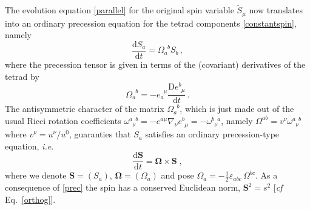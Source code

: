 \documentclass[
superscriptaddress,
preprint,
prd,tightenlines,showpacs,nofootinbib,
eqsecnum,
amsfonts,amsmath,amssymb]{revtex4-1}
\newcommand{\ud}{\mathrm{d}}
\newcommand{\uD}{\mathrm{D}}
\begin{document}
The evolution equation \eqref{parallel} for the original spin variable
$\tilde{S}_\mu$ now translates into an ordinary precession equation
for the tetrad components \eqref{constantspin}, namely
%
\begin{equation}\label{evolS}
\frac{\ud S_{a}}{\ud t} = \Omega_{a}^{\phantom{a}b} S_{b}\, , 
\end{equation} 
%
where the precession tensor is given in terms of the (covariant)
derivatives of the tetrad by
%
\begin{equation}\label{Omegaij}
\Omega_{a}^{\phantom{a}b} = - e_a^{\phantom{a}\mu} \frac{\uD e^b_{\phantom{b}\mu}}{\ud t} \, .
\end{equation} 
%
The antisymmetric character of the matrix $\Omega_{a}^{\phantom{a}b}$,
which is just made out of the usual Ricci rotation coefficients
$\omega_{\phantom{a}\nu\phantom{b}}^{a\phantom{\nu}b} = -
e^{a\mu}\nabla_\nu e^b_{\phantom{b}\mu} = -
\omega_{\phantom{b}\nu\phantom{a}}^{b\phantom{\nu}a}$, namely
$\Omega^{ab} = v^\nu
\omega_{\phantom{a}\nu\phantom{b}}^{a\phantom{\nu}b}$ where $v^\nu =
u^\nu/u^0$, guaranties that $S_a$ satisfies
an ordinary precession-type equation, \textit{i.e.}
%
\begin{equation}\label{prec}
	\frac{\ud \mathbf{S}}{\ud t} = \mathbf{\Omega}\times\mathbf{S} \; , 
\end{equation}
%
where we denote $\mathbf{S}=(S_a)$, $\mathbf{\Omega}=(\Omega_a)$ and
pose $\Omega_{a}=-\frac{1}{2}\varepsilon_{abc}\,\Omega^{bc}$. As a
consequence of \eqref{prec} the spin has a conserved Euclidean norm,
$\mathbf{S}^2=s^2$ [\textit{cf} Eq.~\eqref{orthog}].
\end{document}
